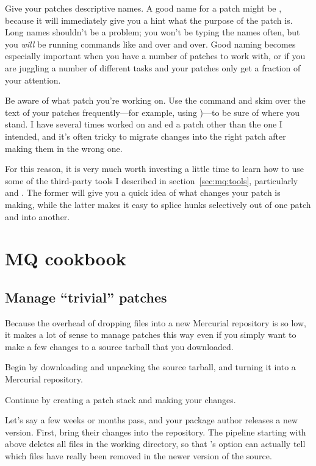 Give your patches descriptive names.  A good name for a patch might be
, because it will immediately give
you a hint what the purpose of the patch is.  Long names shouldn't be
a problem; you won't be typing the names often, but you \emph{will} be
running commands like  and  over and over.
Good naming becomes especially important when you have a number of
patches to work with, or if you are juggling a number of different
tasks and your patches only get a fraction of your attention.

Be aware of what patch you're working on.  Use the 
command and skim over the text of your patches frequently---for
example, using )---to be sure of where
you stand.  I have several times worked on and ed a
patch other than the one I intended, and it's often tricky to migrate
changes into the right patch after making them in the wrong one.

For this reason, it is very much worth investing a little time to
learn how to use some of the third-party tools I described in
section~\ref{sec:mq:tools}, particularly  and
.  The former will give you a quick idea of what
changes your patch is making, while the latter makes it easy to splice
hunks selectively out of one patch and into another.

\section{MQ cookbook}

\subsection{Manage ``trivial'' patches}

Because the overhead of dropping files into a new Mercurial repository
is so low, it makes a lot of sense to manage patches this way even if
you simply want to make a few changes to a source tarball that you
downloaded.

Begin by downloading and unpacking the source tarball,
and turning it into a Mercurial repository.

Continue by creating a patch stack and making your changes.

Let's say a few weeks or months pass, and your package author releases
a new version.  First, bring their changes into the repository.
The pipeline starting with  above deletes all files in
the working directory, so that 's
 option can actually tell which files have
really been removed in the newer version of the source.

